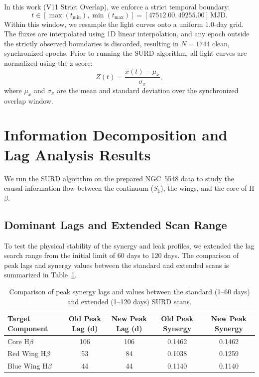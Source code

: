 \documentclass[12pt, a4paper]{article}
\begin{document}
In this work (V11 Strict Overlap), we enforce a strict temporal boundary:
\begin{equation}
t \in [\max(t_{\mathrm{min}}), \min(t_{\mathrm{max}})] = [47512.00, 49255.00]\,\mathrm{MJD}.
\end{equation}
Within this window, we resample the light curves onto a uniform 1.0-day grid. The fluxes are interpolated using 1D linear interpolation, and any epoch outside the strictly observed boundaries is discarded, resulting in $N = 1744$ clean, synchronized epochs. Prior to running the SURD algorithm, all light curves are normalized using the z-score:
\begin{equation}
Z(t) = \frac{x(t) - \mu_x}{\sigma_x},
\end{equation}
where $\mu_x$ and $\sigma_x$ are the mean and standard deviation over the synchronized overlap window.


\section{Information Decomposition and Lag Analysis Results}
\label{sec:results}

We run the SURD algorithm on the prepared NGC~5548 data to study the causal information flow between the continuum ($S_1$), the wings, and the core of H\(\beta\). 

\subsection{Dominant Lags and Extended Scan Range}

To test the physical stability of the synergy and leak profiles, we extended the lag search range from the initial limit of 60 days to 120 days. The comparison of peak lags and synergy values between the standard and extended scans is summarized in Table~\ref{tab:peak_synergy_comparison}.

\begin{table}[ht]
\centering
\begin{tabular}{lcccc}
\hline
\textbf{Target Component} & \textbf{Old Peak Lag (d)} & \textbf{New Peak Lag (d)} & \textbf{Old Peak Synergy} & \textbf{New Peak Synergy} \\
\hline
Core H\(\beta\) & 106 & 106 & 0.1462 & 0.1462 \\
Red Wing H\(\beta\) & 53 & 84 & 0.1038 & 0.1259 \\
Blue Wing H\(\beta\) & 44 & 44 & 0.1140 & 0.1140 \\
\hline
\end{tabular}
\caption{Comparison of peak synergy lags and values between the standard (1--60 days) and extended (1--120 days) SURD scans.}
\label{tab:peak_synergy_comparison}
\end{table}
\end{document}
